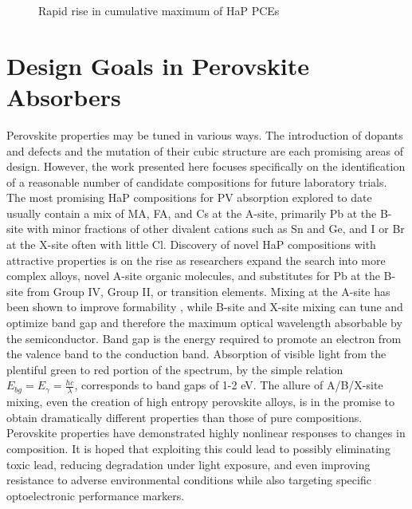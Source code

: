  
\begin{figure}[htbp]
\centering

\caption{\label{fig:nrel} Rapid rise in cumulative maximum of HaP PCEs}
\end{figure}

\section{Design Goals in Perovskite Absorbers}
\label{sec:orgf25049a}
Perovskite properties may be tuned in various ways.
The introduction of dopants and defects \autocite{kim-2020-upper-limit,dahliah-2021-high-throug} and the mutation of their cubic structure \autocite{kar-2018-comput-screen,kim-2017-hybrid-organ} are each promising areas of design.
However, the work presented here focuses specifically on the identification of a reasonable number of candidate compositions for future laboratory trials.
The most promising HaP compositions for PV absorption explored to date usually contain a mix of MA, FA, and Cs at the A-site, primarily Pb at the B-site with minor fractions of other divalent cations such as Sn and Ge, and I or Br at the X-site often with little Cl.
Discovery of novel HaP compositions with attractive properties is on the rise as researchers expand the search into more complex alloys, novel A-site organic molecules, and substitutes for Pb at the B-site from Group IV, Group II, or transition elements.
\autocite{zhu-2019-struc-elect,banerjee-2019-rashb-trigg,ding-2019-cesium-decreas,greenland-2020-correl-phase}
Mixing at the A-site has been shown to improve formability \autocite{zhang-2019-perov-photov}, while B-site and X-site mixing can tune and optimize band gap and therefore the maximum optical wavelength absorbable by the semiconductor.
Band gap is the energy required to promote an electron from the valence band to the conduction band.
Absorption of visible light from the plentiful green to red portion of the spectrum, by the simple relation \(E_{bg} = E_\gamma = \frac{hc}{\lambda}\), corresponds to band gaps of 1-2 \unit{\electronvolt}.
The allure of A/B/X-site mixing, even the creation of high entropy perovskite alloys, is in the promise to obtain dramatically different properties than those of pure compositions.
Perovskite properties have demonstrated highly nonlinear responses to changes in composition.
It is hoped that exploiting this could lead to possibly eliminating toxic lead, reducing degradation under light exposure, and even improving resistance to adverse environmental conditions while also targeting specific optoelectronic performance markers.

